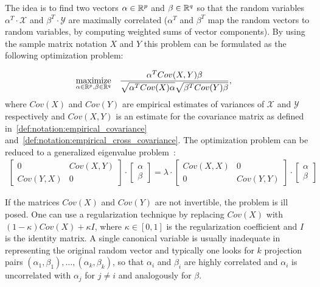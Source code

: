 The idea is to find two vectors $\alpha \in \mathbb{R}^p$ and $\beta \in \mathbb{R}^q$ so that the random variables $\alpha^T \cdot \mathcal{X}$ and $\beta^T \cdot \mathcal{Y}$ are maximally correlated ($\alpha^T$ and $\beta^T$ map the random vectors to random variables, by computing weighted sums of vector components). By using the sample matrix notation $X$ and $Y$ this problem can be formulated as the following optimization problem:

\begin{equation}\label{eq:background:cca:original}
\begin{aligned}
& \underset{\alpha \in \mathbb{R}^{p}, \beta \in \mathbb{R}^{q}}{\text{maximize}}
& & \frac{\alpha^T Cov(X,Y) \beta}{\sqrt{\alpha^T Cov(X) \alpha} \sqrt{\beta^T Cov(Y) \beta}},
\end{aligned}
\end{equation}
where $Cov(X)$ and $Cov(Y)$ are empirical estimates of variances of $\mathcal{X}$ and $\mathcal{Y}$ respectively and $Cov(X,Y)$ is an estimate for the covariance matrix as defined in~\ref{def:notation:empirical_covariance} and~\ref{def:notation:empirical_cross_covariance}.
 The optimization problem can be reduced to a generalized eigenvalue problem~\cite{HardoonCCA}:
\begin{align}\label{eq:background:cca:eigen}
\begin{bmatrix}
    0       & Cov(X,Y) \\
    Cov(Y,X)& 0 
\end{bmatrix}
\cdot
\begin{bmatrix}
    \alpha \\
    \beta
\end{bmatrix}
=
\lambda
\cdot
\begin{bmatrix}
    Cov(X,X) & 0 \\
    0 &  Cov(Y,Y)
\end{bmatrix}
\cdot
\begin{bmatrix}
    \alpha \\
    \beta
\end{bmatrix}
\end{align}

If the matrices $Cov(X)$ and $Cov(Y)$ are not invertible, the problem is ill posed. One can use a regularization technique by replacing $Cov(X)$ with $(1- \kappa)Cov(X) + \kappa I$, where $\kappa \in [0,1]$ is the regularization coefficient and $I$ is the identity matrix.
A single canonical variable is usually inadequate in representing the original random vector and typically one looks for $k$ projection pairs $(\alpha_1, \beta_1),\ldots,(\alpha_k, \beta_k)$, so that $\alpha_i$ and $\beta_i$ are highly correlated and $\alpha_i$ is uncorrelated with $\alpha_j$  for $j \neq i$ and analogously for $\beta$.

